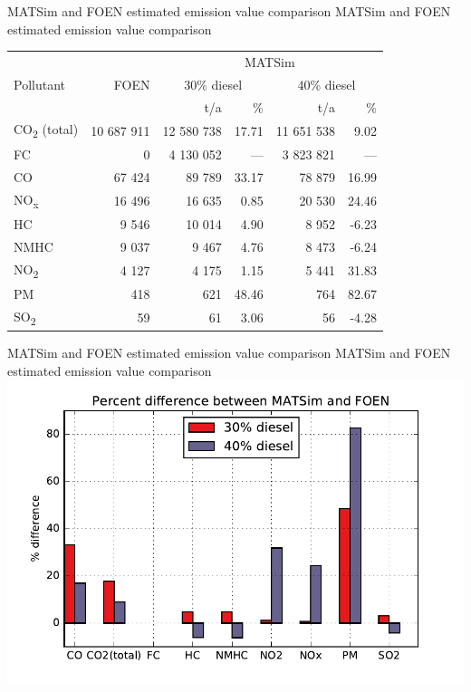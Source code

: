 \createtable%
{MATSim and FOEN estimated emission value comparison}%
{MATSim and FOEN estimated emission value comparison}%
{\label{tab:emissionValueMatsimFoenComparison}}%
{%
  \begin{tabular}[c]{lrrrrr}
    \toprule
    \multirow{3}{*}{Pollutant} & \multirow{3}{*}{FOEN} & \multicolumn{4}{c}{MATSim} \\ 
    & & \multicolumn{2}{c}{30\% diesel} & \multicolumn{2}{c}{40\% diesel}\\
    & t/a & t/a & \% & t/a & \% \\
    \midrule
	CO\textsubscript{2} (total)  &  10 687 911 &    12 580 738 &	17.71 &	   11 651 538 &		 9.02 \\
	FC         					 &           0 &     4 130 052 &	  --- &     3 823 821 &		  --- \\
	CO         					 &      67 424 &        89 789 &	33.17 &        78 879 &		16.99 \\
	NO\textsubscript{x}     	 &      16 496 &        16 635 &	 0.85 &        20 530 &		24.46 \\
	HC       					 &       9 546 &        10 014 &	 4.90 &         8 952 &		-6.23 \\
	NMHC 					     &       9 037 &         9 467 &	 4.76 &         8 473 &		-6.24 \\
	NO\textsubscript{2}        	 &       4 127 &         4 175 &	 1.15 &         5 441 &		31.83 \\
	PM        					 &         418 &           621 &	48.46 &           764 &		82.67 \\
	SO\textsubscript{2}        	 &          59 &            61 &	 3.06 &            56 &		-4.28 \\
    \bottomrule
  \end{tabular}
}%
{}

\createfigure%
{MATSim and FOEN estimated emission value comparison}%
{MATSim and FOEN estimated emission value comparison}%
{\label{fig:emissionValueMatsimFoenComparison}}%
{\includegraphics[width=1.0\textwidth, angle=0]{figures/percent_differences.pdf}}%
{}

